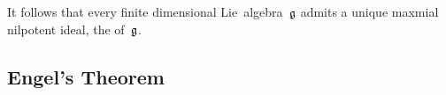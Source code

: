 \begin{remark}

  It follows that every finite dimensional Lie~algebra~$\mathfrak{g}$ admits a unique maxmial nilpotent ideal, the  of~$\mathfrak{g}$.
\end{remark}





\subsection{Engel’s Theorem}


